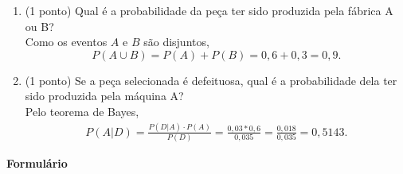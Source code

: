 \documentclass{article}
\begin{document}
\begin{enumerate}
\begin{enumerate}
    \item (1 ponto) Qual é a probabilidade da peça ter sido produzida pela fábrica A ou B?\\
    {\color{blue}
    Como os eventos $A$ e $B$ são disjuntos,
    $$
    P(A \cup B) = P(A) + P(B) = 0,6 + 0,3 = 0,9.
    $$
    }
	
   	\item (1 ponto) Se a peça selecionada é defeituosa, qual é a probabilidade dela ter sido produzida pela máquina A?\\
	{\color{blue} 
	Pelo teorema de Bayes,
	\begin{align*}
	P(A|D) = \frac{P(D|A) \cdot P(A)}{P(D)} = \frac{0,03*0,6}{0,035} = \frac{0,018}{0,035} = 0,5143.
	\end{align*}
	}
\end{enumerate}



\end{enumerate}



\vspace{2cm}

\begin{center}
	\Large{\textbf{Formulário}}
\end{center}
\end{document}
